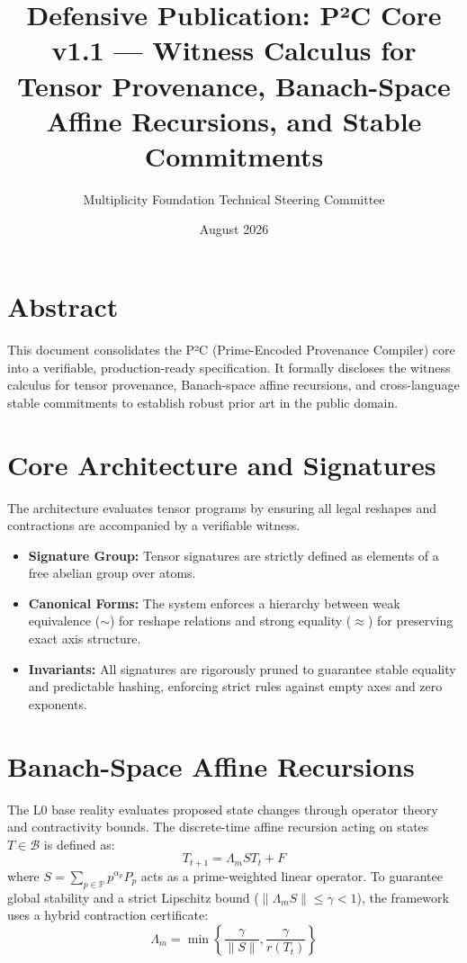 \documentclass[11pt]{article}
\title{Defensive Publication: P²C Core v1.1 --- Witness Calculus for Tensor Provenance, Banach-Space Affine Recursions, and Stable Commitments}
\author{Multiplicity Foundation Technical Steering Committee}
\date{August 2026}
\begin{document}
\maketitle

\section*{Abstract}
This document consolidates the P²C (Prime-Encoded Provenance Compiler) core into a verifiable, production-ready specification. It formally discloses the witness calculus for tensor provenance, Banach-space affine recursions, and cross-language stable commitments to establish robust prior art in the public domain.

\section{Core Architecture and Signatures}
The architecture evaluates tensor programs by ensuring all legal reshapes and contractions are accompanied by a verifiable witness.
\begin{itemize}
    \item \textbf{Signature Group:} Tensor signatures are strictly defined as elements of a free abelian group over atoms.
    \item \textbf{Canonical Forms:} The system enforces a hierarchy between weak equivalence ($\sim$) for reshape relations and strong equality ($\approx$) for preserving exact axis structure.
    \item \textbf{Invariants:} All signatures are rigorously pruned to guarantee stable equality and predictable hashing, enforcing strict rules against empty axes and zero exponents.
\end{itemize}

\section{Banach-Space Affine Recursions}
The L0 base reality evaluates proposed state changes through operator theory and contractivity bounds. The discrete-time affine recursion acting on states $T \in \mathcal{B}$ is defined as:
\[
T_{t+1} = \Lambda_m S T_t + F
\]
where $S = \sum_{p \in \mathbb{P}} p^{\alpha_p} P_p$ acts as a prime-weighted linear operator. To guarantee global stability and a strict Lipschitz bound ($\|\Lambda_m S\| \le \gamma < 1$), the framework uses a hybrid contraction certificate:
\[
\Lambda_m = \min\left\{\frac{\gamma}{\|S\|}, \frac{\gamma}{r(T_t)}\right\}
\]
\end{document}
